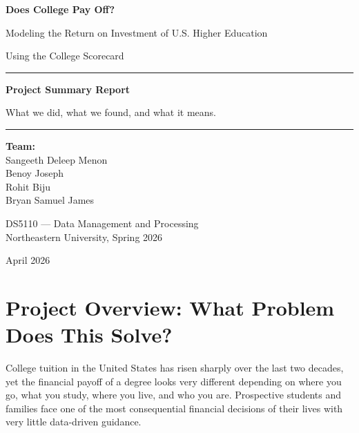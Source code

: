 \documentclass[12pt, letterpaper]{article}
\begin{document}
\begin{titlepage}
  \centering
  \vspace*{1.5cm}
  {\Huge\bfseries\color{accent} Does College Pay Off?\par}
  \vspace{0.5cm}
  {\large\color{darkgray} Modeling the Return on Investment of U.S. Higher Education\par}
  \vspace{0.3cm}
  {\large\color{darkgray} Using the College Scorecard\par}
  \vspace{1.5cm}
  \rule{\linewidth}{0.8pt}
  \vspace{0.4cm}
  {\normalsize\bfseries Project Summary Report\par}
  {\small What we did, what we found, and what it means.\par}
  \vspace{0.4cm}
  \rule{\linewidth}{0.8pt}
  \vspace{1.5cm}
  {\normalsize
    \textbf{Team:}\\[0.3cm]
    Sangeeth Deleep Menon\\
    Benoy Joseph\\
    Rohit Biju\\
    Bryan Samuel James
  \par}
  \vspace{1cm}
  {\normalsize DS5110 — Data Management and Processing\\
  Northeastern University, Spring 2026\par}
  \vfill
  {\small\color{darkgray} April 2026\par}
\end{titlepage}

\tableofcontents
\newpage

\section{Project Overview: What Problem Does This Solve?}

College tuition in the United States has risen sharply over the last two decades, yet the financial payoff of a degree looks very different depending on where you go, what you study, where you live, and who you are. Prospective students and families face one of the most consequential financial decisions of their lives with very little data-driven guidance.
\end{document}
